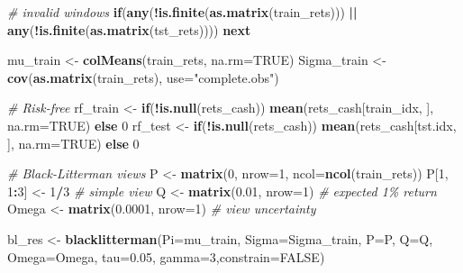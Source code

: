 \documentclass[
  12pt,
]{article}
\newenvironment{Shaded}{\begin{snugshade}}{\end{snugshade}}
\newcommand{\AttributeTok}[1]{\textcolor[rgb]{0.13,0.29,0.53}{#1}}
\newcommand{\CommentTok}[1]{\textcolor[rgb]{0.56,0.35,0.01}{\textit{#1}}}
\newcommand{\ConstantTok}[1]{\textcolor[rgb]{0.56,0.35,0.01}{#1}}
\newcommand{\ControlFlowTok}[1]{\textcolor[rgb]{0.13,0.29,0.53}{\textbf{#1}}}
\newcommand{\DecValTok}[1]{\textcolor[rgb]{0.00,0.00,0.81}{#1}}
\newcommand{\FloatTok}[1]{\textcolor[rgb]{0.00,0.00,0.81}{#1}}
\newcommand{\FunctionTok}[1]{\textcolor[rgb]{0.13,0.29,0.53}{\textbf{#1}}}
\newcommand{\NormalTok}[1]{#1}
\newcommand{\OtherTok}[1]{\textcolor[rgb]{0.56,0.35,0.01}{#1}}
\newcommand{\SpecialCharTok}[1]{\textcolor[rgb]{0.81,0.36,0.00}{\textbf{#1}}}
\newcommand{\StringTok}[1]{\textcolor[rgb]{0.31,0.60,0.02}{#1}}
\begin{document}
\begin{Shaded}
\begin{Highlighting}[]
  \CommentTok{\# invalid windows}
  \ControlFlowTok{if}\NormalTok{(}\FunctionTok{any}\NormalTok{(}\SpecialCharTok{!}\FunctionTok{is.finite}\NormalTok{(}\FunctionTok{as.matrix}\NormalTok{(train\_rets))) }\SpecialCharTok{||} \FunctionTok{any}\NormalTok{(}\SpecialCharTok{!}\FunctionTok{is.finite}\NormalTok{(}\FunctionTok{as.matrix}\NormalTok{(tst\_rets)))) }\ControlFlowTok{next}
  
\NormalTok{  mu\_train    }\OtherTok{\textless{}{-}} \FunctionTok{colMeans}\NormalTok{(train\_rets, }\AttributeTok{na.rm=}\ConstantTok{TRUE}\NormalTok{)}
\NormalTok{  Sigma\_train }\OtherTok{\textless{}{-}} \FunctionTok{cov}\NormalTok{(}\FunctionTok{as.matrix}\NormalTok{(train\_rets), }\AttributeTok{use=}\StringTok{"complete.obs"}\NormalTok{)}
  
  \CommentTok{\# Risk{-}free}
\NormalTok{  rf\_train }\OtherTok{\textless{}{-}} \ControlFlowTok{if}\NormalTok{(}\SpecialCharTok{!}\FunctionTok{is.null}\NormalTok{(rets\_cash)) }\FunctionTok{mean}\NormalTok{(rets\_cash[train\_idx, ], }\AttributeTok{na.rm=}\ConstantTok{TRUE}\NormalTok{) }\ControlFlowTok{else} \DecValTok{0}
\NormalTok{  rf\_test  }\OtherTok{\textless{}{-}} \ControlFlowTok{if}\NormalTok{(}\SpecialCharTok{!}\FunctionTok{is.null}\NormalTok{(rets\_cash)) }\FunctionTok{mean}\NormalTok{(rets\_cash[tst.idx, ], }\AttributeTok{na.rm=}\ConstantTok{TRUE}\NormalTok{) }\ControlFlowTok{else} \DecValTok{0}
  
  \CommentTok{\# Black{-}Litterman views}
\NormalTok{  P }\OtherTok{\textless{}{-}} \FunctionTok{matrix}\NormalTok{(}\DecValTok{0}\NormalTok{, }\AttributeTok{nrow=}\DecValTok{1}\NormalTok{, }\AttributeTok{ncol=}\FunctionTok{ncol}\NormalTok{(train\_rets))}
\NormalTok{  P[}\DecValTok{1}\NormalTok{, }\DecValTok{1}\SpecialCharTok{:}\DecValTok{3}\NormalTok{] }\OtherTok{\textless{}{-}} \DecValTok{1}\SpecialCharTok{/}\DecValTok{3}       \CommentTok{\# simple view}
\NormalTok{  Q }\OtherTok{\textless{}{-}} \FunctionTok{matrix}\NormalTok{(}\FloatTok{0.01}\NormalTok{, }\AttributeTok{nrow=}\DecValTok{1}\NormalTok{) }\CommentTok{\# expected 1\% return}
\NormalTok{  Omega }\OtherTok{\textless{}{-}} \FunctionTok{matrix}\NormalTok{(}\FloatTok{0.0001}\NormalTok{, }\AttributeTok{nrow=}\DecValTok{1}\NormalTok{) }\CommentTok{\# view uncertainty}
  
\NormalTok{  bl\_res }\OtherTok{\textless{}{-}} \FunctionTok{blacklitterman}\NormalTok{(}\AttributeTok{Pi=}\NormalTok{mu\_train, }\AttributeTok{Sigma=}\NormalTok{Sigma\_train, }\AttributeTok{P=}\NormalTok{P, }\AttributeTok{Q=}\NormalTok{Q, }\AttributeTok{Omega=}\NormalTok{Omega, }\AttributeTok{tau=}\FloatTok{0.05}\NormalTok{, }\AttributeTok{gamma=}\DecValTok{3}\NormalTok{,}\AttributeTok{constrain=}\ConstantTok{FALSE}\NormalTok{)}
  

\end{Highlighting}
\end{Shaded}
\end{document}
